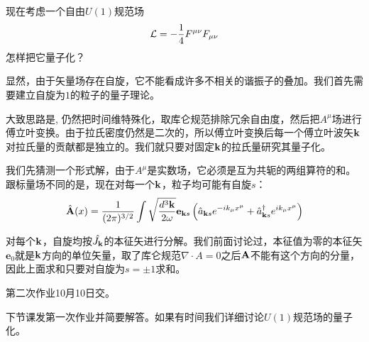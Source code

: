 \documentclass[CJK]{beamer}
\begin{document}
\begin{frame}
\bch
现在考虑一个自由$U(1)$规范场
$${\mathcal{L}} = -\frac{1}{4}{F^{\mu\nu}}{F_{\mu\nu}}$$
怎样把它量子化？

\skipline
显然，由于矢量场存在自旋，它不能看成许多不相关的谐振子的叠加。我们首先需要建立自旋为$1$的粒子的量子理论。

大致思路是, 仍然把时间维特殊化，取库仑规范排除冗余自由度，然后把$A^\mu$场进行傅立叶变换。由于拉氏密度仍然是二次的，所以傅立叶变换后每一个傅立叶波矢${\mathbf{k}}$对拉氏量的贡献都是独立的。我们就只要对固定${\mathbf{k}}$的拉氏量研究其量子化。

\ech
\end{frame}

\begin{frame}
\bch
我们先猜测一个形式解，由于$A^\mu$是实数场，它必须是互为共轭的两组算符的和。跟标量场不同的是，现在对每一个${\mathbf{k}}$，粒子均可能有自旋$s$：
$$\hat{{\mathbf{A}}}(x) = \frac{1}{(2\pi)^{3/2}} \int \sqrt{\frac{d^3{\mathbf{k}}}{2\omega}} \mathbf{e}_{{\mathbf{k}} s}\left({\hat{a}}_{{\mathbf{k}} s} e^{-ik_\mu x^\mu} + {\hat{a}^\dagger}_{{\mathbf{k}} s}e^{ik_\mu x^\mu}\right) $$

对每个${\mathbf{k}}$，自旋均按$\hat{J_{\mathbf{k}}}$的本征矢进行分解。我们前面讨论过，本征值为零的本征矢$\mathbf{e}_0$就是${\mathbf{k}}$方向的单位矢量，取了库仑规范$\nabla\cdot A=0$之后${\mathbf{A}}$不能有这个方向的分量，因此上面求和只要对自旋为$s=\pm 1$求和。
\ech
\end{frame}

\begin{frame}
\bch
第二次作业10月10日交。

\skipline
下节课发第一次作业并简要解答。如果有时间我们详细讨论$U(1)$规范场的量子化。
\ech
\end{frame}
\end{document}
